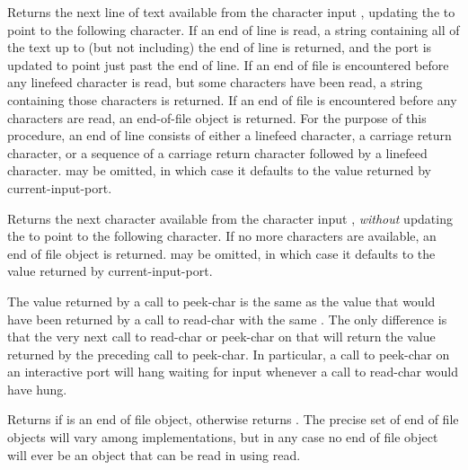 \begin{entry}{%
}

Returns the next line of text available from the character input
, updating the  to point to the following character.
If an end of line is read, a string containing all of the text up to
(but not including) the end of line is returned, and the port is updated
to point just past the end of line. If an end of file is encountered
before any linefeed character is read, but some characters have been
read, a string containing those characters is returned. If an end of
file is encountered before any characters are read, an end-of-file
object is returned.  For the purpose of this procedure, an end of line
consists of either a linefeed character, a carriage return character, or a
sequence of a carriage return character followed by a linefeed character.
 may be omitted, in which case it defaults to the value returned
by {\cf current-input-port}.

\end{entry}


\begin{entry}{%
}

Returns the next character available from the character input ,
{\em without} updating
the  to point to the following character.  If no more characters
are available, an end of file object is returned.   may be
omitted, in which case it defaults to the value returned by {\cf current-input-port}.

\begin{note}
The value returned by a call to {\cf peek-char} is the same as the
value that would have been returned by a call to {\cf read-char} with the
same .  The only difference is that the very next call to
{\cf read-char} or {\cf peek-char} on that  will return the
value returned by the preceding call to {\cf peek-char}.  In particular, a call
to {\cf peek-char} on an interactive port will hang waiting for input
whenever a call to {\cf read-char} would have hung.
\end{note}

\end{entry}


\begin{entry}{%
}

Returns \schtrue{} if  is an end of file object, otherwise returns
\schfalse.  The precise set of end of file objects will vary among
implementations, but in any case no end of file object will ever be an object
that can be read in using {\cf read}.

\end{entry}


